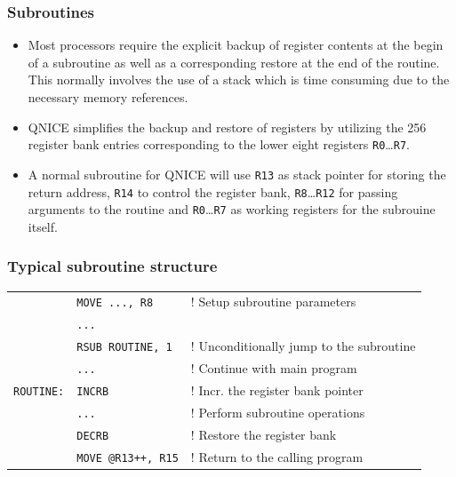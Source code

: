 \documentclass{beamer}
\begin{document}
%
   \begin{frame}
    \frametitle{Subroutines}
    \begin{itemize}
     \item Most processors require the explicit backup of register contents
      at the begin of a subroutine as well as a corresponding restore at the 
      end of the routine. This normally involves the use of a stack which is 
      time consuming due to the necessary memory references.
     \item QNICE simplifies the backup and restore of registers by utilizing
      the 256 register bank entries corresponding to the lower eight registers
      {\tt R0}\dots{\tt R7}.
     \item A normal subroutine for QNICE will use {\tt R13} as stack pointer
      for storing the return address, {\tt R14} to control the register bank,
      {\tt R8}\dots{\tt R12} for passing arguments to the routine and
      {\tt R0}\dots{\tt R7} as working registers for the subrouine itself.
    \end{itemize}
   \end{frame}
%
   \begin{frame}
    \frametitle{Typical subroutine structure}
    {\small
    \begin{center}
     \begin{tabular}{lll}
      &{\tt MOVE ..., R8}&! Setup subroutine parameters\\
      &{\tt ...}&\\
      &{\tt RSUB ROUTINE, 1}&! Unconditionally jump to the subroutine\\
      &{\tt...}&! Continue with main program\\
      {\tt ROUTINE:}&{\tt INCRB}&! Incr. the register bank pointer\\
      &{\tt ...}&! Perform subroutine operations\\
      &{\tt DECRB}&! Restore the register bank\\
      &{\tt MOVE @R13++, R15}&! Return to the calling program\\
     \end{tabular}
    \end{center}
    }
   \end{frame}
%
\end{document}
